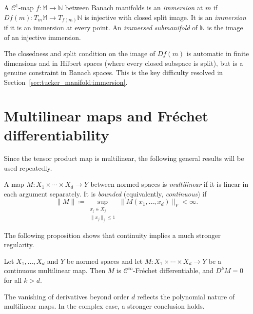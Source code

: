 \begin{definition}
\label{def:immersion}
A $\mathcal{C}^1$-map $f: \mathbb{M} \to \mathbb{N}$ between Banach
manifolds is an \emph{immersion} at $m$ if $Df(m): T_m\mathbb{M} \to
T_{f(m)}\mathbb{N}$ is injective with closed split image. It is an
\emph{immersion} if it is an immersion at every point. An
\emph{immersed submanifold} of $\mathbb{N}$ is the image of an injective
immersion.
\end{definition}

The closedness and split condition on the image of $Df(m)$ is automatic
in finite dimensions and in Hilbert spaces (where every closed subspace is
split), but is a genuine constraint in Banach spaces. This is the key
difficulty resolved in Section~\ref{sec:tucker_manifold:immersion}.

\section{Multilinear maps and Fréchet differentiability}
\label{sec:banach:multilinear}

Since the tensor product map is multilinear, the following general results
will be used repeatedly.

\begin{definition}
A map $M: X_1 \times \cdots \times X_d \to Y$ between normed spaces is
\emph{multilinear} if it is linear in each argument separately. It is
\emph{bounded} (equivalently, \emph{continuous}) if
\begin{equation*}
    \|M\| \coloneqq \sup_{\substack{x_j \in X_j \\ \|x_j\|_j \leq 1}}
    \|M(x_1, \ldots, x_d)\|_Y < \infty.
\end{equation*}
\end{definition}

The following proposition shows that continuity implies a much stronger
regularity.

\begin{proposition}[{\cite[Proposition~79]{HJ2012}}]
\label{prop:multilinear_smooth}
Let $X_1, \ldots, X_d$ and $Y$ be normed spaces and let
$M: X_1 \times \cdots \times X_d \to Y$ be a continuous multilinear map.
Then $M$ is $\mathcal{C}^\infty$-Fréchet differentiable, and
$D^k M = 0$ for all $k > d$.
\end{proposition}

The vanishing of derivatives beyond order $d$ reflects the polynomial
nature of multilinear maps. In the complex case, a stronger conclusion
holds.

